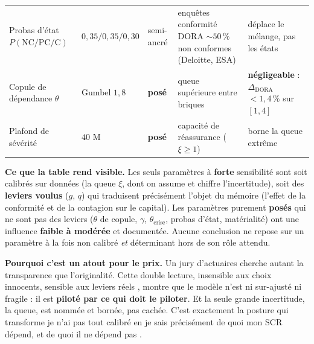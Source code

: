 \documentclass[11pt,a4paper]{article}
\providecommand{\euro}{\texteuro}
\begin{document}
\begin{center}
\begin{tabular}{@{}p{2.7cm} p{2.6cm} p{1.7cm} p{4.0cm} p{3.6cm}@{}}
Probas d'état $P(\text{NC/PC/C})$ & $0{,}35/0{,}35/0{,}30$ & semi-ancré & enquêtes conformité DORA ${\sim}50\,\%$ non conformes (Deloitte, ESA) & déplace le mélange, pas les états \\
Copule de dépendance $\theta$ & Gumbel $1{,}8$ & \textbf{posé} & queue supérieure entre briques & \textbf{négligeable} : $\Delta_{\text{DORA}}$ $<1{,}4\,\%$ sur $[1,4]$ \\
Plafond de sévérité & $40$ M\euro{} & \textbf{posé} & capacité de réassurance ($\xi\ge 1$) & borne la queue extrême \\
\bottomrule
\end{tabular}
\end{center}

\vspace{4pt}
\textbf{Ce que la table rend visible.} Les seuls paramètres à \textbf{forte} sensibilité sont
soit calibrés sur données (la queue $\xi$, dont on assume et chiffre l'incertitude), soit des
\textbf{leviers voulus} ($g$, $q$) qui traduisent précisément l'objet du mémoire (l'effet de
la conformité et de la contagion sur le capital). Les paramètres purement \textbf{posés} qui
ne sont pas des leviers ($\theta$ de copule, $\gamma$, $\theta_{\text{crise}}$, probas d'état,
matérialité) ont une influence \textbf{faible à modérée} et documentée. Aucune conclusion ne
repose sur un paramètre à la fois non calibré \emph{et} déterminant hors de son rôle attendu.

\begin{cle}
\textbf{Pourquoi c'est un atout pour le prix.} Un jury d'actuaires cherche autant la
transparence que l'originalité. Cette double lecture, \og insensible aux choix innocents,
sensible aux leviers réels \fg, montre que le modèle n'est ni sur-ajusté ni fragile : il est
\textbf{piloté par ce qui doit le piloter}. Et la seule grande incertitude, la queue, est
nommée et bornée, pas cachée. C'est exactement la posture qui transforme \og je n'ai pas tout
calibré \fg{} en \og je sais précisément de quoi mon SCR dépend, et de quoi il ne dépend pas \fg.
\end{cle}
\end{document}
